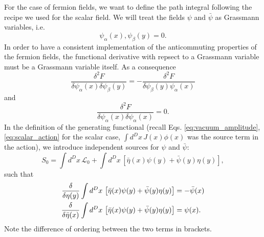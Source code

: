 \documentclass{article}
\numberwithin{equation}{section}
\begin{document}
For the case of fermion fields, we want to define the path integral following the recipe we used for the scalar field. We will treat the fields $\psi$ and $\bar{\psi}$ as Grassmann variables, i.e. 
\begin{equation}
    {\psi_\alpha(x), \psi_\beta(y)} = 0.
\end{equation}
In order to have a consistent implementation of the anticommuting properties of the fermion fields, the functional derivative with repsect to a Grassmann variable must be a Grassmann variable itself. As a consequence 
\begin{equation}
    \frac{\delta^2 F}{\delta \psi_\alpha(x) \delta\psi_\beta(y)} = - \frac{\delta^2 F}{\delta\psi_\beta(y) \psi_\alpha(x)}
\end{equation}
and 
\begin{equation}
    \frac{\delta^2 F}{\delta \psi_\alpha(x) \delta\psi_\alpha(x)} = 0.
\end{equation}
In the definition of the generating functional (recall Eqs. \ref{eq:vacuum_amplitude}, \ref{eq:scalar_action} for the scalar case, $\int d^Dx \, J(x) \phi(x)$ was the source term in the action), we introduce independent sources for $\psi$ and $\bar{\psi}$:
\begin{equation}
    S_0 = \int d^Dx \, \mathcal{L}_0 + \int d^Dx \, \left[\bar{\eta}(x)\psi(y) + \bar{\psi}(y) \eta(y)\right],
\end{equation}
such that
\begin{align}
    \fdv{\eta(y)} \int d^Dx \, \left[\bar{\eta}(x)\psi(y) + \bar{\psi}(y) \eta(y)\right] &= -\bar{\psi}(x) \\
    \fdv{\bar{\eta}(x)} \int d^Dx \, \left[\bar{\eta}(x)\psi(y) + \bar{\psi}(y) \eta(y)\right] &= \psi(x).
\end{align}
Note the difference of ordering between the two terms in brackets.
\end{document}
